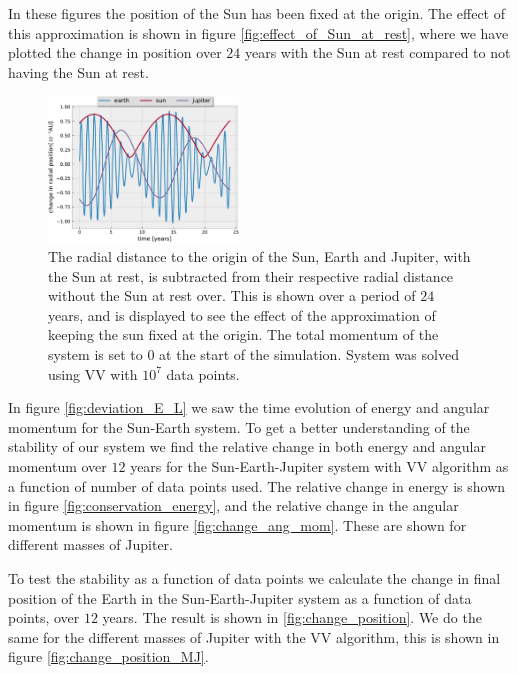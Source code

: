 \documentclass[%
 reprint,
nofootinbib,
aps,
]{revtex4-1}
\begin{document}
In these figures the position of the Sun has been fixed at the origin. The effect of this approximation is shown in figure \vref{fig:effect_of_Sun_at_rest}, where we have plotted the change in position over $24$ years with the Sun at rest compared to not having the Sun at rest.
\begin{figure}
  \centering
  \includegraphics[width=0.45\textwidth]{../figures/sun_movement_effect.pdf}
  \caption{The radial distance to the origin of the Sun, Earth and Jupiter, with the Sun at rest, is subtracted from their respective radial distance without the Sun at rest over. This is shown over a period of $24$ years, and is displayed to see the effect of the approximation of keeping the sun fixed at the origin. The total momentum of the system is set to $0$ at the start of the simulation. System was solved using VV with $10^7$ data points.}
  \label{fig:effect_of_Sun_at_rest}
\end{figure}

In figure \vref{fig:deviation_E_L} we saw the time evolution of energy and angular momentum for the Sun-Earth system. To get a better understanding of the stability of our system we find the relative change in both energy and angular momentum over $12$ years for the Sun-Earth-Jupiter system with VV algorithm as a function of number of data points used. The relative change in energy is shown in figure \vref{fig:conservation_energy}, and the relative change in the angular momentum is shown in figure \vref{fig:change_ang_mom}. These are shown for different masses of Jupiter.

To test the stability as a function of data points we calculate the change in final position of the Earth in the Sun-Earth-Jupiter system as a function of data points, over $12$ years. The result is shown in \vref{fig:change_position}. We do the same for the different masses of Jupiter with the VV algorithm, this is shown in figure \vref{fig:change_position_MJ}.
\end{document}
